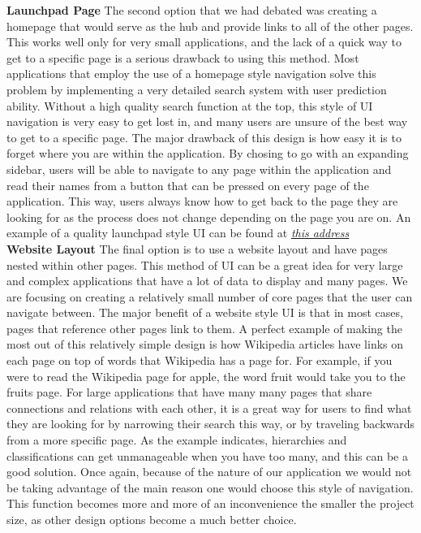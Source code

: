 \documentclass[onecolumn, draftclsnofoot,10pt, compsoc]{IEEEtran}
\begin{document}
\noindent \textbf{Launchpad Page}
The second option that we had debated was creating a homepage that would serve as the hub and provide links to all of the other pages.
This works well only for very small applications, and the lack of a quick way to get to a specific page is a serious drawback to using this method.
Most applications that employ the use of a homepage style navigation solve this problem by implementing a very detailed search system with user prediction ability.
Without a high quality search function at the top, this style of UI navigation is very easy to get lost in, and many users are unsure of the best way to get to a specific page.
The major drawback of this design is how easy it is to forget where you are within the application. 
By chosing to go with an expanding sidebar, users will be able to navigate to any page within the application and read their names from a button that can be pressed on every page of the application.
This way, users always know how to get back to the page they are looking for as the process does not change depending on the page you are on.
An example of a quality launchpad style UI can be found at {\em \href{http://www.rit.edu/news/lib/filelib/201112/mobile_app_home.jpg}{this address}}\\

\noindent \textbf{Website Layout}
The final option is to use a website layout and have pages nested within other pages. This method of UI can be a great idea for very large and complex applications that have a lot of data to display and many pages.
We are focusing on creating a relatively small number of core pages that the user can navigate between. The major benefit of a website style UI is that in most cases, pages that reference other pages link to them.
A perfect example of making the most out of this relatively simple design is how Wikipedia articles have links on each page on top of words that Wikipedia has a page for.
For example, if you were to read the Wikipedia page for apple, the word fruit would take you to the fruits page.
For large applications that have many many pages that share connections and relations with each other, it is a great way for users to find what they are looking for by narrowing their search this way, or by traveling backwards from a more specific page.
As the example indicates, hierarchies and classifications can get unmanageable when you have too many, and this can be a good solution.
Once again, because of the nature of our application we would not be taking advantage of the main reason one would choose this style of navigation.
This function becomes more and more of an inconvenience the smaller the project size, as other design options become a much better choice.\\
\end{document}
